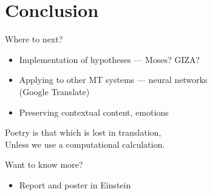 \documentclass[notes]{beamer}
\newcommand{\quot}[2]{
    \begin{exampleblock}{}
      #1
      \vskip5mm
    \hspace*\fill{\small --- #2}
  \end{exampleblock}
}
\begin{document}
\section{Conclusion}
\begin{frame}{Where to next?}
  \begin{itemize}
  \item Implementation of hypotheses --- Moses? GIZA?
  \item Applying to other MT systems --- neural networks \\(Google Translate)
  \item Preserving contextual content, emotions
  \end{itemize}
\end{frame}
\begin{frame}
  \quot{Poetry is that which is lost in translation, \\ Unless we use
    a computational calculation.}{Soon?}
\end{frame}

\begin{frame}{Want to know more?}
  \begin{itemize}
  \item Report and poster in Einstein
  \end{itemize}
\end{frame}
\end{document}
